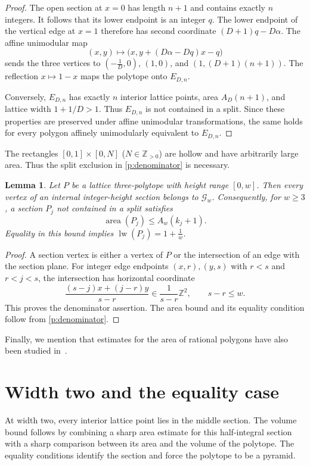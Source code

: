 \documentclass[reqno, 11pt]{article}
\numberwithin{equation}{section}
\newtheorem{lemma}[lemma]{Lemma}
\theoremstyle{definition}
\newcommand{\Z}{\mathbb Z}
\DeclareMathOperator{\area}{area}
\DeclareMathOperator{\lw}{lw}
\numberwithin{equation}{section}
\begin{document}
\begin{proof}
The open section at $x=0$ has length $n+1$ and contains exactly $n$ integers. It follows that its lower endpoint is an integer $q$. The lower endpoint of the vertical edge at \(x=1\) therefore has second coordinate $(D+1)q-D\alpha$. The affine unimodular map
\[
 (x,y)\longmapsto\bigl(x,y+(D\alpha-Dq)x-q\bigr)
\]
sends the three vertices to $(-\frac{1}{D},0)$, $(1,0)$, and $(1,(D+1)(n+1))$. The reflection $x\mapsto1-x$ maps the polytope onto $E_{D,n}$.

Conversely, $E_{D,n}$ has exactly $n$ interior lattice points, area $A_D(n+1)$, and lattice width $1+1/D>1$. Thus $E_{D,n}$ is not contained in a split. Since these properties are preserved under affine unimodular transformations, the same holds for every polygon affinely unimodularly equivalent to $E_{D,n}$.
\end{proof}

The rectangles $[0,1]\times[0,N]$ ($N\in\Z_{>0}$) are hollow and have arbitrarily large area. Thus the split exclusion in \cref{p:denominator} is necessary. 

\begin{lemma}\label{p:rational}
Let $P$ be a lattice three-polytope with height range $[0,w]$. Then every vertex of an internal integer-height section
belongs to $\mathcal G_w$. Consequently, for $w\ge3$,
a section $P_j$ not contained in a split satisfies
\[
\area(P_j)\le A_w(k_j+1).
\]
Equality in this bound implies
$\lw(P_j)=1+\frac1w$.
\end{lemma}
\begin{proof}
A section vertex is either a vertex of $P$ or the intersection of
an edge with the section plane. For integer edge endpoints
$(x,r),(y,s)$ with $r<s$ and $r<j<s$, the intersection has
horizontal coordinate
\[
\frac{(s-j)x+(j-r)y}{s-r}\in\frac1{s-r}\Z^2,
\qquad s-r\le w.
\]
This proves the denominator assertion.
The area bound and its equality condition follow
from \cref{p:denominator}.
\end{proof}


Finally, we mention that estimates for the area of rational polygons have also been studied in~\cite{BS2024}.


\section{Width two and the equality case}\label{w2:section}

At width two, every interior lattice point lies in the middle section. 
The volume bound follows by combining a sharp area estimate for this half-integral section with a sharp comparison between its
area and the volume of the polytope. 
The equality conditions identify the section and force the polytope to be a pyramid.
\end{document}
